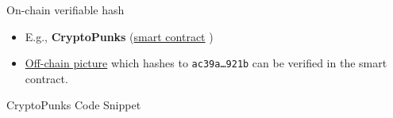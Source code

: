 \documentclass[handout]{beamer}
\begin{document}
\begin{frame}{On-chain verifiable hash}

	\begin{itemize}
		\item E.g., \textbf{CryptoPunks} (\href{https://etherscan.io/address/0xb47e3cd837ddf8e4c57f05d70ab865de6e193bbb}{\link smart contract} )
		\item  \href{https://www.larvalabs.com/public/images/cryptopunks/punks.png}{\link Off-chain picture} which hashes to \texttt{\scriptsize ac39a\dots 921b} can be verified in the smart contract.
	\end{itemize}
	\begin{samplecode}{CryptoPunks Code Snippet}
		
	\end{samplecode}
\end{frame}
\end{document}
